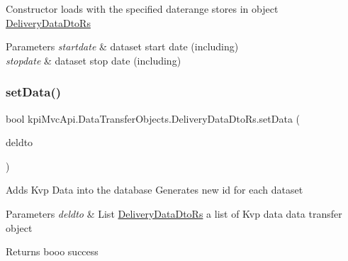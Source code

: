 Constructor loads with the specified daterange stores in object {\ttfamily \hyperlink{classkpi_mvc_api_1_1_data_transfer_objects_1_1_delivery_data_dto_rs}{Delivery\+Data\+Dto\+Rs}} 


\begin{DoxyParams}{Parameters}
{\em startdate} & dataset start date (including)\\
\hline
{\em stopdate} & dataset stop date (including)\\
\hline
\end{DoxyParams}
\mbox{\label{classkpi_mvc_api_1_1_data_transfer_objects_1_1_delivery_data_dto_rs_ab7a5599b20fc48614aa3245dc5ee8302}} 
\subsubsection{\texorpdfstring{set\+Data()}{setData()}\hspace{0.1cm}{\footnotesize\ttfamily [1/2]}}
{\footnotesize\ttfamily bool kpi\+Mvc\+Api.\+Data\+Transfer\+Objects.\+Delivery\+Data\+Dto\+Rs.\+set\+Data (\begin{DoxyParamCaption}\item[{List$<$ \hyperlink{classkpi_mvc_api_1_1_data_transfer_objects_1_1_delivery_data_dto}{Delivery\+Data\+Dto} $>$}]{deldto }\end{DoxyParamCaption})\hspace{0.3cm}{\ttfamily [inline]}}



Adds Kvp Data into the database Generates new id for each dataset 


\begin{DoxyParams}{Parameters}
{\em deldto} & {\ttfamily  List \hyperlink{classkpi_mvc_api_1_1_data_transfer_objects_1_1_delivery_data_dto_rs}{Delivery\+Data\+Dto\+Rs} } a list of Kvp data data transfer object \\
\hline
\end{DoxyParams}
\begin{DoxyReturn}{Returns}
{\ttfamily booo} success
\end{DoxyReturn}
\mbox{\label{classkpi_mvc_api_1_1_data_transfer_objects_1_1_delivery_data_dto_rs_ab7a5599b20fc48614aa3245dc5ee8302}} 
